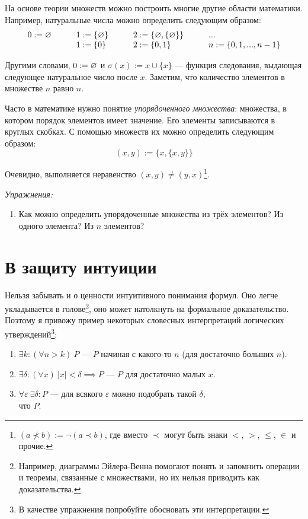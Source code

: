 На основе теории множеств можно построить многие другие области математики.
Например, натуральные числа можно определить следующим образом:
\[
	\begin{array}{llll}
		0  :=\varnothing\qquad & 1  :=\{\varnothing\}\qquad & 2  :=\{\varnothing,\{\varnothing\}\}\qquad & ... \\
		                 & 1:=\{0\}\qquad       & 2:=\{0,1\}
		                 & n:=\{0,1,...,n-1\}
	\end{array}
\]

Другими словами, $0:=\varnothing$ и $\sigma(x):=x\cup \{x\}$ --- функция следования,
выдающая следующее натуральное число после $x$. Заметим, что количество элементов
в множестве $n$ равно $n$.

Часто в математике нужно понятие {\it упорядоченного множества}:
множества, в котором порядок элементов имеет значение. Его элементы записываются
в круглых скобках. С помощью множеств их можно определить следующим образом:
\[
	(x,y):=\{x,\{x,y\}\}
\]

Очевидно, выполняется неравенство $(x,y)\neq (y,x)$\footnote{
	$(a\nprec b):=\lnot(a\prec b)$, где вместо $\prec$ могут быть знаки
	$<$, $>$, $\leq$, $\in$ и прочие.
}.

{\it Упражнения:}
\begin{enumerate}
	\item{}Как можно определить упорядоченные множества из трёх элементов?
	Из одного элемента? Из $n$ элементов?
\end{enumerate}

\pagebreak

\part{В защиту интуиции}

Нельзя забывать и о ценности интуитивного понимания формул.
Оно легче укладывается в голове\footnote{Например, диаграммы
	Эйлера-Венна помогают понять и запомнить операции и теоремы, связанные с
	множествами, но их нельзя приводить как доказательства.},
оно может натолкнуть на формальное доказательство. Поэтому я привожу пример
некоторых словесных интерпретаций логических утверждений\footnote{В качестве
	упражнения попробуйте обосновать эти интерпретации.}:
\begin{enumerate}
	\item{}$\exists k:(\forall n>k)~P$ --- $P$ начиная с какого-то $n$
	(для достаточно больших $n$).
	\item{}$\exists \delta:(\forall x)~|x|<\delta\implies P$ --- $P$ для
	достаточно малых $x$.
	\item{}$\forall \varepsilon~\exists \delta:P$ ---
	для всякого $\varepsilon$ можно подобрать такой $\delta$,\\что $P$.
\end{enumerate}

